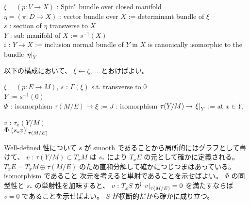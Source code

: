 \begin{Theorem}
\itemwhen
  \For \(\xi = (p : V \to X)\) : \(\text{Spin}^c\) bundle over closed manifold \\
  \Let \(\eta = (\pi : D \to X)\) : vector bundle over \(X\) := determinant bundle of \(\xi\) \\
  \For \(s\) : section of \(\eta\) transverse to \(X\) \\
  \Let \(Y\) : sub manifold of \(X\) := \(s^{-1}(X)\) \\
  \Let \(i\) : \(Y \to X\) := inclusion
\itemprop
  \Then normal bundle of \(Y\) in \(X\) is canonically isomorphic to the bundle \(\left. {\eta} \right| _{Y}\)
\end{Theorem}
  
\begin{Proof}
\itemprof
  以下の構成において、 \(\xi \leftarrow \zeta, \ldots\) とおけばよい。
\end{Proof}

\begin{Definition}
\itemwhen
  \For \(\xi = (p : E \to M)\), \(s\) : \(\Gamma(\xi)\) s.t. transverse to \(0\) \\
  \Let \(Y\) := \(s^{-1}(0)\) \\
  \Let \(\Phi\) : isomorphism \(\tau(M/E) \to \xi\) :=  
\itemdefi
  \Define \(J\) : isomorphism \(\tau(Y/M) \to \left. {\xi} \right| _{Y}\) := at \(x \in Y\),
  \begin{indentblock}
    \For \(v\) : \(\tau_{x}(Y/M)\) \\
    \Return \(\Phi \left. {(s_* v)} \right| _{\tau(M/E)}\) 
  \end{indentblock}
\end{Definition}

\begin{Proof}
\itemprof
  Well-defined 性について
  \(s\) が smooth であることから局所的にはグラフとして書けて、 \(v\) : \(\tau(Y/M) \subset T_x M\) は \(s_*\) により \(T_x E\) の元として確かに定義される。
  \(T_x E = T_x M \oplus \tau(M/E)\) のため直和分解して確かにつじつまはあっている。
\itemprof
  isomorphism であること
  次元を考えると単射であることを示せばよい。
  \(\Phi\) の同型性と \(s_*\) の単射性を加味すると、 \(v\) : \(T_x S\) が \(\left. {v} \right| _{\tau(M/E)} = 0\) を満たすならば \(v = 0\) であることを示せばよい。
  \(S\) が横断的だから確かに成り立つ。
\end{Proof}

